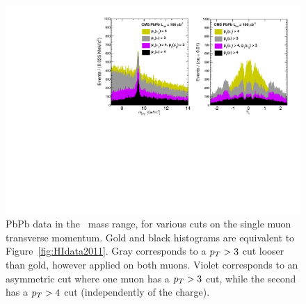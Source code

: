 \begin{figure}[h]
  \begin{center}
    \includegraphics[width=\textwidth]{Chapters/aYield/variouscuts.pdf}
    \caption{PbPb data in the \PgU\ mass range, for various cuts on the
      single muon transverse momentum. Gold and black histograms are
      equivalent to Figure~\ref{fig:HIdata2011}. Gray corresponds to a
      $p_{T} > 3$ cut looser than gold, however applied on both muons. Violet corresponds
      to an asymmetric cut where one muon has a $p_{T} > 3$ cut, while the
      second has a $p_{T} > 4$ cut (independently of the charge).}
    \label{fig:tryptcuts}
  \end{center}
\end{figure}

